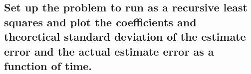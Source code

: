 \documentclass[12pt,letterpaper, onecolumn]{exam}
\begin{document}
\begin{questions}
\begin{parts}

        \part{Set up the problem to run as a recursive least squares and plot the coefficients and theoretical standard deviation of the estimate error and the actual estimate error as a function of time.}


\end{parts}
\end{questions}
\end{document}

